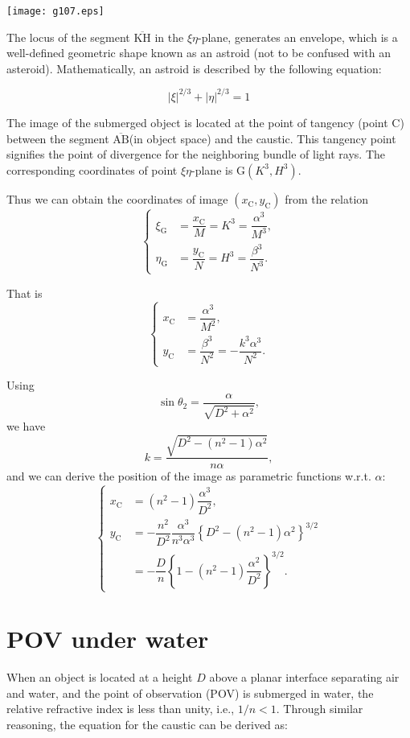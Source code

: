\documentclass[twocolumn]{article}
\begin{document}
\hfill \texttt{[image: g107.eps]} \hfill\null

The locus of the segment $\overline{\mathrm{KH}}$ in the $\xi\eta$-plane, generates an envelope, which is a 
well-defined geometric shape known as an astroid (not to be confused with an asteroid). 
Mathematically, an astroid is described by the following equation:

$$ \left| \xi \right|^{2/3} + \left| \eta \right|^{2/3} = 1 $$

The image of the submerged object is located at the point of tangency (point $\mathrm{C}$) 
between the segment $\overline{\mathrm{AB}}$(in object space) and the caustic. 
This tangency point signifies the point of divergence for the 
neighboring bundle of light rays. The corresponding coordinates of point $\xi\eta$-plane is 
$\mathrm{G}(K^3, H^3)$.

Thus we can obtain the coordinates of image $(x_{\mathrm{C}}^{}, y_{\mathrm{C}}^{})$ 
from the relation
$$ \left\{ 
\begin{aligned}
	\xi_{\mathrm{G}}^{} &= \dfrac{x_{\mathrm{C}}^{}}{M} = K^3 = \dfrac{\alpha^3}{M^3},\\
	\eta_{\mathrm{G}}^{} &= \dfrac{y_{\mathrm{C}}^{}}{N} = H^3 = \dfrac{\beta^3}{N^3}.
\end{aligned}
\right.$$

That is
$$ \left\{ 
\begin{aligned}
	x_{\mathrm{C}}^{} &= \dfrac{\alpha^3}{M^2},\\
	y_{\mathrm{C}}^{} &= \dfrac{\beta^3}{N^2}=-\dfrac{k^3\alpha^3}{N^2}.
\end{aligned}
\right.$$

Using 
$$\sin\theta_2 = \dfrac{\alpha}{\sqrt{D^2+\alpha^2}},$$
we have
$$k = \dfrac{\sqrt{D^2-(n^2-1)\alpha^2}}{n\alpha},$$
and we can derive the position of the image as parametric functions w.r.t. $\alpha$:
$$ \left\{ 
\begin{aligned}
	x_{\mathrm{C}}^{} &= (n^2-1)\dfrac{\alpha^3}{D^2},\\
	y_{\mathrm{C}}^{} &= -\dfrac{n^2}{D^2}\dfrac{\alpha^3}{n^3\alpha^3}\left\{ D^2-(n^2-1)\alpha^2 \right\}^{3/2}\\
	&=-\dfrac{D}{n}\left\{ 1-(n^2-1)\dfrac{\alpha^2}{D^2} \right\}^{3/2}.
\end{aligned}
\right.$$

\section{POV under water}
When an object is located at a height $D$ above a planar interface separating 
air and water, and the point of observation (POV) is submerged in water, the 
relative refractive index is less than unity, i.e., $1/n < 1$. Through similar 
reasoning, the equation for the caustic can be derived as:
\end{document}
